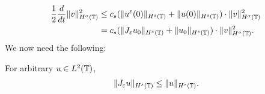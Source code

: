 %
\begin{equation}
	\begin{split}
		\label{11x}
		\frac{1}{2}\frac{d}{dt} \|v\|_{H^{\sigma}(\mathbb{T})}^2
		& \le
		c_s (\|u^{\varepsilon}(0)\|_{H^{s}(\mathbb{T})}
		+ \|u(0)\|_{H^{s}(\mathbb{T})})\cdot \|v\|_{H^{\sigma}(\mathbb{T})}^2
		\\
		& = c_s (\|J_\varepsilon u_0\|_{H^{s}(\mathbb{T})}
		+ \|u_0\|_{H^{s}(\mathbb{T})})\cdot \|v\|_{H^{\sigma}(\mathbb{T})}^2.
	\end{split}
\end{equation}
We now need the following:
\begin{proposition}
	\label{lem3r}
	For arbitrary $u \in L^2(\mathbb{T})$,
	\begin{equation}
		\begin{split}
			\|J_\varepsilon u\|_{H^s(\mathbb{T})} \le \|u\|_{H^s(\mathbb{T})}.
			\label{lem100u}
		\end{split}
	\end{equation}
\end{proposition}
%
%
%
%

